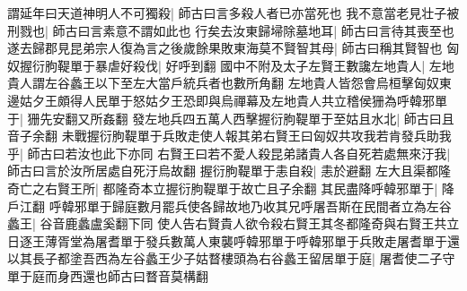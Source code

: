 謂延年曰天道神明人不可獨殺|{
	師古曰言多殺人者已亦當死也}
我不意當老見壮子被刑戮也|{
	師古曰言素意不謂如此也}
行矣去汝東歸埽除墓地耳|{
	師古曰言待其喪至也}
遂去歸郡見昆弟宗人復為言之後歲餘果敗東海莫不賢智其母|{
	師古曰稱其賢智也}
匈奴握衍朐鞮單于暴虐好殺伐|{
	好呼到翻}
國中不附及太子左賢王數讒左地貴人|{
	左地貴人謂左谷蠡王以下至左大當戶統兵者也數所角翻}
左地貴人皆怨會烏桓擊匈奴東邊姑夕王頗得人民單于怒姑夕王恐即與烏禪幕及左地貴人共立稽侯㹪為呼韓邪單于|{
	㹪先安翻又所姦翻}
發左地兵四五萬人西擊握衍朐鞮單于至姑且水北|{
	師古曰且音子余翻}
未戰握衍朐鞮單于兵敗走使人報其弟右賢王曰匈奴共攻我若肯發兵助我乎|{
	師古曰若汝也此下亦同}
右賢王曰若不愛人殺昆弟諸貴人各自死若處無來汙我|{
	師古曰言於汝所居處自死汙烏故翻}
握衍朐鞮單于恚自殺|{
	恚於避翻}
左大且渠都隆奇亡之右賢王所|{
	都隆奇本立握衍朐鞮單于故亡且子余翻}
其民盡降呼韓邪單于|{
	降戶江翻}
呼韓邪單于歸庭數月罷兵使各歸故地乃收其兄呼屠吾斯在民間者立為左谷蠡王|{
	谷音鹿蠡盧奚翻下同}
使人告右賢貴人欲令殺右賢王其冬都隆奇與右賢王共立日逐王薄胥堂為屠耆單于發兵數萬人東襲呼韓邪單于呼韓邪單于兵敗走屠耆單于還以其長子都塗吾西為左谷蠡王少子姑瞀樓頭為右谷蠡王留居單于庭|{
	屠耆使二子守單于庭而身西還也師古曰瞀音莫構翻}



